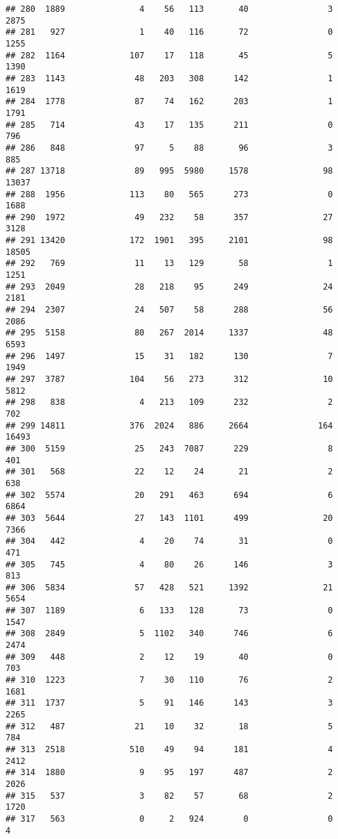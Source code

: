 \documentclass[
]{article}
\begin{document}
\begin{verbatim}
## 280  1889               4    56   113       40                3  2875
## 281   927               1    40   116       72                0  1255
## 282  1164             107    17   118       45                5  1390
## 283  1143              48   203   308      142                1  1619
## 284  1778              87    74   162      203                1  1791
## 285   714              43    17   135      211                0   796
## 286   848              97     5    88       96                3   885
## 287 13718              89   995  5980     1578               98 13037
## 288  1956             113    80   565      273                0  1688
## 290  1972              49   232    58      357               27  3128
## 291 13420             172  1901   395     2101               98 18505
## 292   769              11    13   129       58                1  1251
## 293  2049              28   218    95      249               24  2181
## 294  2307              24   507    58      288               56  2086
## 295  5158              80   267  2014     1337               48  6593
## 296  1497              15    31   182      130                7  1949
## 297  3787             104    56   273      312               10  5812
## 298   838               4   213   109      232                2   702
## 299 14811             376  2024   886     2664              164 16493
## 300  5159              25   243  7087      229                8   401
## 301   568              22    12    24       21                2   638
## 302  5574              20   291   463      694                6  6864
## 303  5644              27   143  1101      499               20  7366
## 304   442               4    20    74       31                0   471
## 305   745               4    80    26      146                3   813
## 306  5834              57   428   521     1392               21  5654
## 307  1189               6   133   128       73                0  1547
## 308  2849               5  1102   340      746                6  2474
## 309   448               2    12    19       40                0   703
## 310  1223               7    30   110       76                2  1681
## 311  1737               5    91   146      143                3  2265
## 312   487              21    10    32       18                5   784
## 313  2518             510    49    94      181                4  2412
## 314  1880               9    95   197      487                2  2026
## 315   537               3    82    57       68                2  1720
## 317   563               0     2   924        0                0     4

\end{verbatim}
\end{document}
